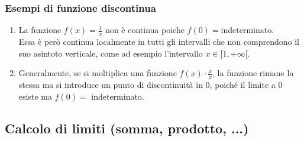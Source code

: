 \documentclass{article}
\begin{document}
\subsubsection{Esempi di funzione discontinua}
\begin{enumerate}
    \item La funzione \(f(x)=\frac{1}{x}\) non è continua poiche \(f(0)=\text{indeterminato}\).\\
        Essa è però continua localmente in tutti gli intervalli che non comprendono il suo
        asintoto verticale, come ad esempio l'intervallo \(x \in [1, +\infty[\).
    \item Generalmente, se si moltiplica una funzione \(f(x) \cdot \frac{x}{x}\), la funzione
        rimane la stessa ma si introduce un punto di discontinuità in 0, poiché il limite
        a 0 esiste ma \(f(0)=\) indeterminato.
\end{enumerate}

\newpage
\subsection{Calcolo di limiti (somma, prodotto, ...)}
\end{document}

